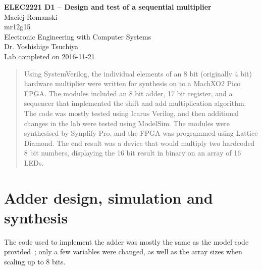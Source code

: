 \documentclass[a4paper,11pt]{article}
\begin{document}
  
\begin{center}
{\Large{\textbf{ELEC2221 D1 -- Design and test of a sequential multiplier}}} \\ [\baselineskip]
Maciej Romanski \\
mr12g15 \\
Electronic Engineering with Computer Systems \\
Dr. Yoshishige Tsuchiya \\
Lab completed on 2016-11-21
\end{center}

\begin{abstract}
Using SystemVerilog, the individual elements of an 8 bit (originally 4 bit) hardware multiplier were written for synthesis on to a MachXO2 Pico FPGA. The modules included an 8 bit adder, 17 bit register, and a sequencer that implemented the shift and add multiplication algorithm. The code was mostly tested using Icarus Verilog, and then additional changes in the lab were tested using ModelSim. The modules were synthesised by Synplify Pro, and the FPGA was programmed using Lattice Diamond. The end result was a device that would multiply two hardcoded 8 bit numbers, displaying the 16 bit result in binary on an array of 16 LEDs.
\end{abstract}

\section{Adder design, simulation and synthesis}
The code used to implement the adder was mostly the same as the model code provided~\cite{addercode}; only a few variables were changed, as well as the array sizes when scaling up to 8 bits.
\end{document}
